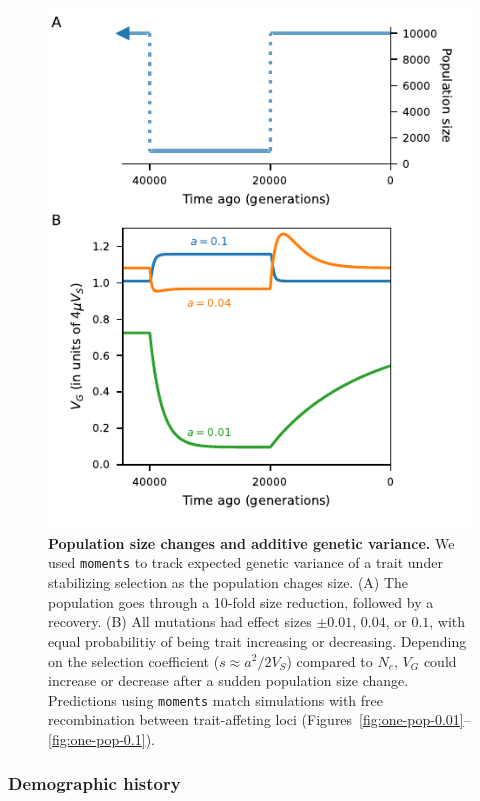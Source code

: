 \documentclass{article}
\newcommand{\moments}{\texttt{moments}\xspace}
\begin{document}
\begin{figure}[tb!]
    \centering
    \includegraphics{../figures/one_pop.pdf}
    \caption{
        \textbf{Population size changes and additive genetic variance.}
        We used \moments to track expected genetic variance of a trait
        under stabilizing selection as the population chages size. (A) The
        population goes through a 10-fold size reduction, followed by a recovery.
        (B) All mutations had effect sizes $\pm0.01$, $0.04$, or $0.1$, with equal
        probabilitiy of being trait increasing or decreasing. Depending on the
        selection coefficient ($s\approx a^2/2V_S$) compared to $N_e$, $V_G$
        could increase or decrease after a sudden population size change.
        Predictions using \moments match simulations with free recombination
        between trait-affeting loci
        (Figures~\ref{fig:one-pop-0.01}--\ref{fig:one-pop-0.1}).
    }
    \label{fig:one-pop}
\end{figure}

\subsubsection*{Demographic history}
\end{document}
